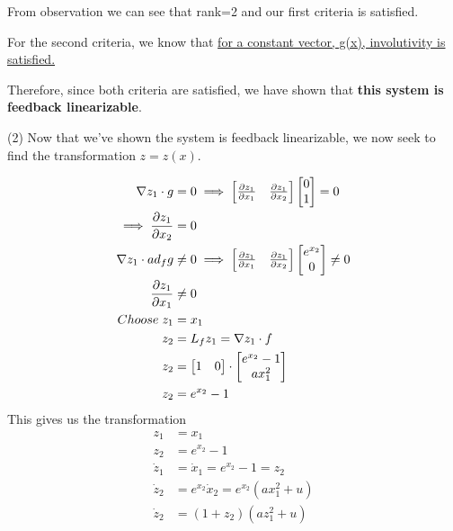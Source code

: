 \documentclass{article}
\begin{document}
  \noindent From observation we can see that rank=2 and our first criteria is satisfied.
  \newline \newline

  \noindent For the second criteria, we know that \underline{for a constant vector, g(x),
  involutivity is satisfied.} \newline \newline

  \noindent Therefore, since both criteria are satisfied, we have shown that \textbf{this
    system is feedback linearizable}. \newpage

  (2) Now that we've shown the system is feedback linearizable, we now seek to
  find the transformation $z=z(x)$.
  
  \begin{align*}
    \nabla z_1 \cdot g &= 0 \implies
    \begin{bmatrix}
       \frac{\partial z_1}{\partial x_1} & \frac{\partial z_1}{\partial x_2}                                           
    \end{bmatrix}
    \begin{bmatrix}
      0 \\
      1
    \end{bmatrix} = 0 \\
    \implies \frac{\partial z_1}{\partial x_2} &= 0 \\
    \nabla z_1 \cdot ad_fg &\neq 0 \implies
    \begin{bmatrix}
       \frac{\partial z_1}{\partial x_1} & \frac{\partial z_1}{\partial x_2}                                           
    \end{bmatrix}
    \begin{bmatrix}
      e^{x_2} \\
      0
    \end{bmatrix} \neq 0 \\
    \frac{\partial z_1}{\partial x_1} &\neq 0 \\
    Choose \hspace{1mm} z_1 &= x_1 \\
    z_2 &= L_fz_1 = \nabla z_1 \cdot f \\
    z_2 &= \begin{bmatrix}
             1 & 0
           \end{bmatrix} \cdot
           \begin{bmatrix}
             e^{x_2}-1 \\
             ax_1^2
           \end{bmatrix} \\
    z_2 &= e^{x_2} - 1
  \end{align*}
  This gives us the transformation
  \begin{align*}
    z_1 &= x_1 \\
    z_2 &= e^{x_2} - 1 \\
    \dot{z}_1 &= \dot{x}_1 = e^{x_2} - 1 = z_2 \\
    \dot{z}_2 &= e^{x_2}\dot{x}_2 = e^{x_2}(ax_1^2+u) \\
    \dot{z}_2 &= (1+z_2) (az_1^2+u) 
  \end{align*}
\end{document}
